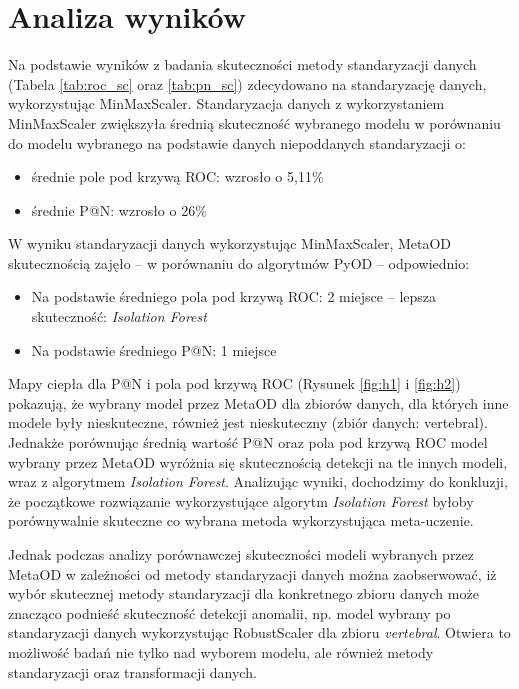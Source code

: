\section{Analiza wyników}
Na podstawie wyników z badania skuteczności metody standaryzacji danych (Tabela \ref{tab:roc_sc} oraz \ref{tab:pn_sc}) zdecydowano na standaryzację danych, wykorzystując MinMaxScaler. Standaryzacja  danych z wykorzystaniem MinMaxScaler zwiększyła średnią skuteczność wybranego modelu w porównaniu do modelu wybranego na podstawie danych niepoddanych standaryzacji o:
\begin{itemize}
    \item średnie pole pod krzywą ROC: wzrosło o 5,11\%
    \item średnie P@N: wzrosło o 26\%
\end{itemize}
W wyniku standaryzacji danych wykorzystując MinMaxScaler, MetaOD skutecznością zajęło -- w porównaniu do algorytmów PyOD -- odpowiednio: 
\begin{itemize}
    \item Na podstawie średniego pola pod krzywą ROC: 2 miejsce -- lepsza skuteczność: \textit{Isolation Forest} 
    \item Na podstawie średniego P@N: 1 miejsce 
\end{itemize}

Mapy ciepła dla P@N i pola pod krzywą ROC (Rysunek \ref{fig:h1} i \ref{fig:h2}) pokazują, że wybrany model przez MetaOD dla zbiorów danych, dla których inne modele były nieskuteczne, również jest nieskuteczny (zbiór danych: vertebral). Jednakże porównując średnią wartość P@N oraz pola pod krzywą ROC model wybrany przez MetaOD wyróżnia się skutecznością detekcji na tle innych modeli, wraz z algorytmem \textit{Isolation Forest}. Analizując wyniki, dochodzimy do konkluzji, że początkowe rozwiązanie wykorzystujące algorytm \textit{Isolation Forest} byłoby porównywalnie skuteczne co wybrana metoda wykorzystująca meta-uczenie. 

Jednak podczas analizy porównawczej skuteczności modeli wybranych przez MetaOD w zależności od metody standaryzacji danych można zaobserwować, iż wybór skutecznej metody standaryzacji dla konkretnego zbioru danych może znacząco podnieść skuteczność detekcji anomalii, np. model wybrany po standaryzacji danych wykorzystując RobustScaler dla zbioru \textit{vertebral}. Otwiera to możliwość badań nie tylko nad wyborem modelu, ale również metody standaryzacji oraz transformacji danych.
